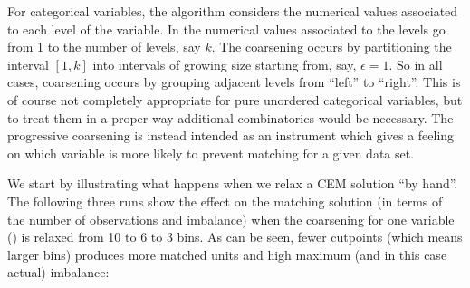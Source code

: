 \documentclass[article]{jss}
\begin{document}
For categorical variables, the algorithm considers the numerical values
associated to each level of the variable. In  the numerical values associated to
the levels go from 1 to the number of levels, say $k$. The coarsening occurs by
partitioning the interval $[1,k]$ into intervals of growing size starting from, say, $\epsilon=1$.
So in all cases, coarsening occurs by grouping adjacent levels from ``left'' to ``right''.
This is of course not completely appropriate for pure unordered categorical variables, but to
treat them in a proper way additional combinatorics would be necessary. The progressive
coarsening is instead intended as an instrument which gives a feeling on which variable
is more likely to prevent matching for a given data set.

We start by illustrating what happens when we relax a CEM solution
``by hand''.  The following three runs show the effect on the matching
solution (in terms of the number of observations and imbalance) when
the coarsening for one variable () is relaxed from 10 to 6
to 3 bins.  As can be seen, fewer cutpoints (which means larger bins)
produces more matched units and high maximum (and in this case
actual) imbalance:
\end{document}
